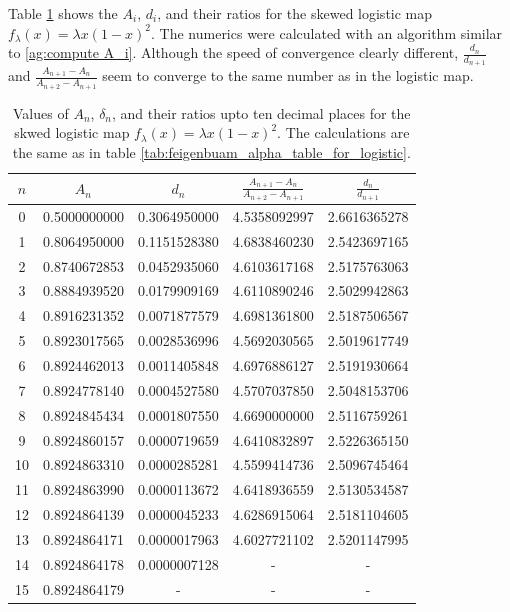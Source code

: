 Table \ref{tab:feigenbuam_constants_skewed_logistic_map} shows the $A_i$, $d_i$, and their ratios for the skewed logistic map $f_{\lambda} (x) = \lambda x (1-x)^2$.
The numerics were calculated with an algorithm similar to \ref{ag:compute A_i}.
Although the speed of convergence clearly different, 
$ \frac{d_n}{d_{n+1}} $ and $\frac{A_{n+1} - A_n}{A_{n+2} - A_{n+1}}$ seem to converge to the same number as in the logistic map.
\begin{table}
\centering
\begin{tabular}{|c|c|c|c|c|}
\hline
\( n \) & \( A_n \) & \( d_n \)  & \(\frac{A_{n+1} - A_n}{A_{n+2} - A_{n+1}}\)  &  \(\frac{d_n}{d_{n+1}}\) \\ \hline
0 & 0.5000000000 & 0.3064950000 & 4.5358092997 & 2.6616365278 \\
1 & 0.8064950000 & 0.1151528380 & 4.6838460230 & 2.5423697165 \\
2 & 0.8740672853 & 0.0452935060 & 4.6103617168 & 2.5175763063 \\
3 & 0.8884939520 & 0.0179909169 & 4.6110890246 & 2.5029942863 \\
4 & 0.8916231352 & 0.0071877579 & 4.6981361800 & 2.5187506567 \\
5 & 0.8923017565 & 0.0028536996 & 4.5692030565 & 2.5019617749 \\
6 & 0.8924462013 & 0.0011405848 & 4.6976886127 & 2.5191930664 \\
7 & 0.8924778140 & 0.0004527580 & 4.5707037850 & 2.5048153706 \\
8 & 0.8924845434 & 0.0001807550 & 4.6690000000 & 2.5116759261 \\
9 & 0.8924860157 & 0.0000719659 & 4.6410832897 & 2.5226365150 \\
10 & 0.8924863310 & 0.0000285281 & 4.5599414736 & 2.5096745464 \\
11 & 0.8924863990 & 0.0000113672 & 4.6418936559 & 2.5130534587 \\
12 & 0.8924864139 & 0.0000045233 & 4.6286915064 & 2.5181104605 \\
13 & 0.8924864171 & 0.0000017963 & 4.6027721102 & 2.5201147995 \\
14 & 0.8924864178 & 0.0000007128 &  - &  - \\
15 & 0.8924864179 &  - &  - &  - \\
\hline
\end{tabular}
\caption{
	Values of \( A_n \), \( \delta_n \), and their ratios upto ten decimal places for the skwed logistic map $f_{\lambda}(x) = \lambda x(1-x)^2$.
	The calculations are the same as in table \ref{tab:feigenbuam_alpha_table_for_logistic}.
}
\label{tab:feigenbuam_constants_skewed_logistic_map}
\end{table}
